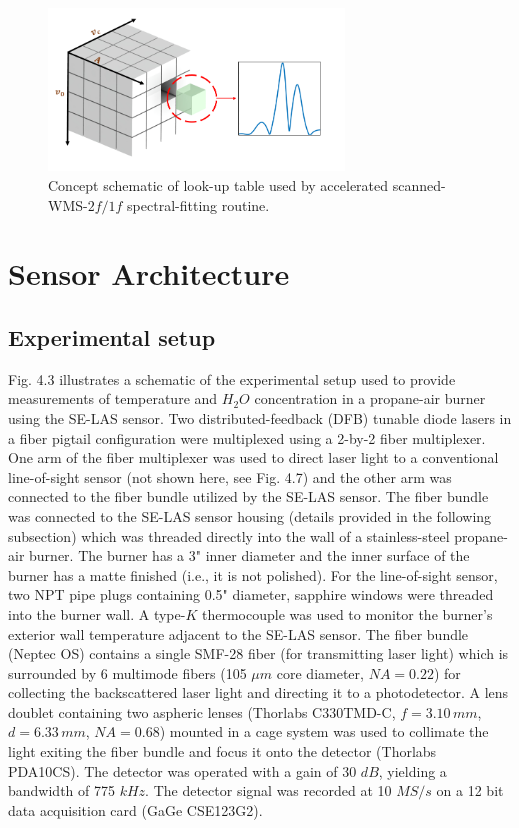  \begin{figure}[h]
    \centering       
    \includegraphics[width=0.7\textwidth]{fig/ch4_fig4.png}
        \caption{Concept schematic of look-up table used by accelerated scanned-WMS-$2f/1f$ spectral-fitting routine.}
    \label{fig:ch4_2}
\end{figure}


\section{Sensor Architecture}
\subsection{Experimental setup}

Fig. 4.3 illustrates a schematic of the experimental setup used to provide measurements of temperature and $H_2O$ concentration in a propane-air burner using the SE-LAS sensor. Two distributed-feedback (DFB) tunable diode lasers in a fiber pigtail configuration were multiplexed using a 2-by-2 fiber multiplexer. One arm of the fiber multiplexer was used to direct laser light to a conventional line-of-sight sensor (not shown here, see Fig. 4.7) and the other arm was connected to the fiber bundle utilized by the SE-LAS sensor. The fiber bundle was connected to the SE-LAS sensor housing (details provided in the following subsection) which was threaded directly into the wall of a stainless-steel propane-air burner. The burner has a 3" inner diameter and the inner surface of the burner has a matte finished (i.e., it is not polished). For the line-of-sight sensor, two NPT pipe plugs containing 0.5" diameter, sapphire windows were threaded into the burner wall. A type-$K$ thermocouple was used to monitor the burner’s exterior wall temperature adjacent to the SE-LAS sensor. The fiber bundle (Neptec OS) contains a single SMF-28 fiber (for transmitting laser light) which is surrounded by 6 multimode fibers (105 $\mu m$ core diameter, $NA=0.22$) for collecting the backscattered laser light and directing it to a photodetector. A lens doublet containing two aspheric lenses (Thorlabs C330TMD-C, $f=3.10 \,mm$, $d=6.33 \,mm$, $NA=0.68$) mounted in a cage system was used to collimate the light exiting the fiber bundle and focus it onto the detector (Thorlabs PDA10CS). The detector was operated with a gain of 30 $dB$, yielding a bandwidth of 775 $kHz$. The detector signal was recorded at 10 $MS/s$ on a 12 bit data acquisition card (GaGe CSE123G2).


